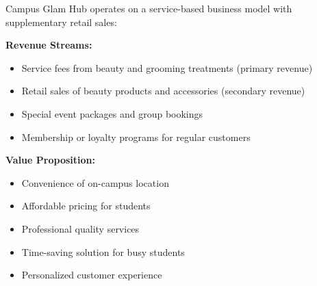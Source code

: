 \documentclass[a4paper,12pt]{article}
\begin{document}
Campus Glam Hub operates on a service-based business model with supplementary retail sales:

\textbf{Revenue Streams:}
\begin{itemize}[leftmargin=2em]
    \item Service fees from beauty and grooming treatments (primary revenue)
    \item Retail sales of beauty products and accessories (secondary revenue)
    \item Special event packages and group bookings
    \item Membership or loyalty programs for regular customers
\end{itemize}

\textbf{Value Proposition:}
\begin{itemize}[leftmargin=2em]
    \item Convenience of on-campus location
    \item Affordable pricing for students
    \item Professional quality services
    \item Time-saving solution for busy students
    \item Personalized customer experience
\end{itemize}

\vspace{1em}
\end{document}
